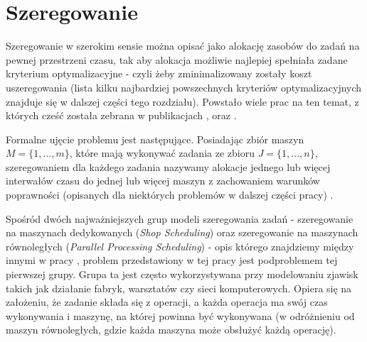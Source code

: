 \documentclass[brudnopis]{xmgr}
\begin{document}
\section{Szeregowanie}
Szeregowanie w szerokim sensie można opisać jako alokację zasobów do zadań na pewnej przestrzeni czasu, tak aby alokacja możliwie najlepiej spełniała zadane kryterium optymalizacyjne - czyli żeby zminimalizowany zostały koszt uszeregowania (lista kilku najbardziej powszechnych kryteriów optymalizacyjnych znajduje się w dalszej części tego rozdziału). Powstało wiele prac na ten temat, z których cześć została zebrana w publikacjach \cite{graves1981review}, \cite{lawler1993sequencing} oraz \cite{lee1997current}.
\medskip

Formalne ujęcie problemu jest następujące. Posiadając zbiór maszyn $M=\{1,...,m\}$, które mają wykonywać zadania ze zbioru $J=\{1,...,n\}$, szeregowaniem dla każdego zadania nazywamy alokacje jednego lub więcej interwałów czasu do jednej lub więcej maszyn z zachowaniem warunków poprawności (opisanych dla niektórych problemów w dalszej części pracy) \cite{brucker2007scheduling}.
\medskip


Spośród dwóch najważniejszych grup modeli szeregowania zadań - szeregowanie na maszynach dedykowanych (\emph{Shop Scheduling}) oraz szeregowanie na maszynach równoległych (\emph{Parallel Processing Scheduling}) - opis którego znajdziemy między innymi w pracy \cite{drozdowski2009scheduling}, problem przedstawiony w tej pracy jest podproblemem tej pierwszej grupy. Grupa ta jest często wykorzystywana przy modelowaniu zjawisk takich jak działanie fabryk, warsztatów czy sieci komputerowych.
Opiera się na założeniu, że zadanie składa się z operacji, a każda operacja ma swój czas wykonywania i maszynę, na której powinna być wykonywana (w odróżnieniu od maszyn równoległych, gdzie każda maszyna może obsłużyć każdą operację).
\medskip
\end{document}
